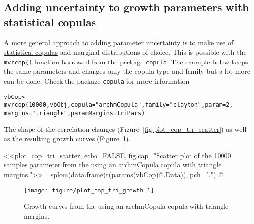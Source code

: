 \documentclass[a4paper,english,10pt]{article}\usepackage[]{graphicx}\usepackage[]{color}
\makeatletter
\def\maxwidth{ %
  \ifdim\Gin@nat@width>\linewidth
    \linewidth
  \else
    \Gin@nat@width
  \fi
}
\newcommand{\hlnum}[1]{\textcolor[rgb]{0.2,0.2,0.2}{#1}}%
\newcommand{\hlstr}[1]{\textcolor[rgb]{0.2,0.2,0.2}{#1}}%
\newcommand{\hlstd}[1]{\textcolor[rgb]{0,0,0}{#1}}%
\newcommand{\hlkwb}[1]{\textcolor[rgb]{0.361,0.506,0.596}{#1}}%
\newcommand{\hlkwc}[1]{\textcolor[rgb]{0.361,0.506,0.596}{#1}}%
\newcommand{\hlkwd}[1]{\textcolor[rgb]{0.361,0.506,0.596}{#1}}%
\newenvironment{kframe}{%
 \def\at@end@of@kframe{}%
 \ifinner\ifhmode%
  \def\at@end@of@kframe{\end{minipage}}%
  \begin{minipage}{\columnwidth}%
 \fi\fi%
 \def\FrameCommand##1{\hskip\@totalleftmargin \hskip-\fboxsep
 \colorbox{shadecolor}{##1}\hskip-\fboxsep
     \hskip-\linewidth \hskip-\@totalleftmargin \hskip\columnwidth}%
 \MakeFramed {\advance\hsize-\width
   \@totalleftmargin\z@ \linewidth\hsize
   \@setminipage}}%
 {\par\unskip\endMakeFramed%
 \at@end@of@kframe}
\newenvironment{knitrout}{}{} %
\newcommand{\code}[1]{{\texttt{#1}}}
\newcommand{\pkg}[1]{{\texttt{#1}}}
\makeatother
\begin{document}
\subsection{Adding uncertainty to growth parameters with statistical copulas}

A more general approach to adding parameter uncertainty is to make use of \href{http://www.encyclopediaofmath.org/index.php/Copula}{statistical copulas} and marginal distributions of choice. This is possible with the \code{mvrcop()} function borrowed from the package \href{http://cran.r-project.org/web/packages/copula/}{\pkg{copula}}. The example below keeps the same parameters and changes only the copula type and family but a lot more can be done. Check the package \pkg{copula} for more information. 


\begin{knitrout}
\color{fgcolor}\begin{kframe}
\begin{alltt}
\hlstd{vbCop} \hlkwb{<-} \hlkwd{mvrcop}\hlstd{(}\hlnum{10000}\hlstd{, vbObj,} \hlkwc{copula}\hlstd{=}\hlstr{"archmCopula"}\hlstd{,} \hlkwc{family}\hlstd{=}\hlstr{"clayton"}\hlstd{,} \hlkwc{param}\hlstd{=}\hlnum{2}\hlstd{,}
                \hlkwc{margins}\hlstd{=}\hlstr{"triangle"}\hlstd{,} \hlkwc{paramMargins}\hlstd{=triPars)}
\end{alltt}
\end{kframe}
\end{knitrout}

The shape of the correlation changes (Figure~\ref{fig:plot_cop_tri_scatter}) as well as the resulting growth curves (Figure~\ref{fig:plot_cop_tri_growth}). 

<<plot_cop_tri_scatter, echo=FALSE, fig.cap="Scatter plot of the 10000 samples 
parameter from the using an archmCopula copula with triangle margins.">>=
splom(data.frame(t(params(vbCop)@.Data)), pch=".")
@

\begin{knitrout}
\color{fgcolor}\begin{figure}[H]

{\centering \texttt{[image: figure/plot\_cop\_tri\_growth-1]} 

}

\caption[Growth curves from the using an archmCopula copula with triangle margins]{Growth curves from the using an archmCopula copula with triangle margins.}\label{fig:plot_cop_tri_growth}
\end{figure}


\end{knitrout}
\end{document}
